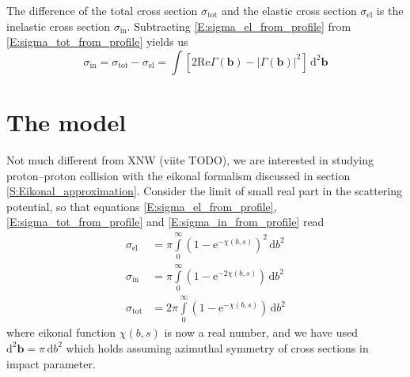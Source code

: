 \documentclass[a4paper, twoside, english, 12pt]{article}
\begin{document}
The difference of the total cross section $\sigma_\text{tot}$ and the elastic cross section $\sigma_\text{el}$ is the inelastic cross section $\sigma_\text{in}$. Subtracting \eqref{E:sigma_el_from_profile} from \eqref{E:sigma_tot_from_profile} yields us
\begin{equation}\label{E:sigma_in_from_profile}
	\sigma_\text{in} = \sigma_\text{tot} - \sigma_\text{el} = \int \left[ 2\text{Re}\Gamma(\mathbf{b}) - \left|\Gamma(\mathbf{b})\right|^2 \right] \,\text{d}^2\mathbf{b}
\end{equation}



\section{The model}\label{S:malli}


Not much different from XNW (viite TODO), we are interested in studying proton--proton collision with the eikonal formalism discussed in section \ref{S:Eikonal_approximation}. Consider the limit of small real part in the scattering potential, so that equations \eqref{E:sigma_el_from_profile}, \eqref{E:sigma_tot_from_profile} and \eqref{E:sigma_in_from_profile} read
\begin{align}
	\sigma_{\text{el}} &= \pi\int\limits_0^\infty \left(1-\text{e}^{-\chi(b,s)} \right)^2 \, \text{d}b^2 \label{E:sigma_el} \\[0.8em]
	\sigma_\text{in} &= \pi\int\limits_0^\infty \left(1-\text{e}^{-2\chi(b,s)} \right) \, \text{d}b^2 \label{E:sigma_in} \\[0.8em]
	\sigma_\text{tot} &= 2\pi\int\limits_0^\infty \left(1-\text{e}^{-\chi(b,s)} \right) \, \text{d}b^2 \label{E:sigma_tot}
\end{align}
where eikonal function $\chi(b,s)$ is now a real number, and we have used $\text{d}^2\mathbf{b} = \pi\,\text{d}b^2$ which holds assuming azimuthal symmetry of cross sections in impact parameter.
\end{document}
